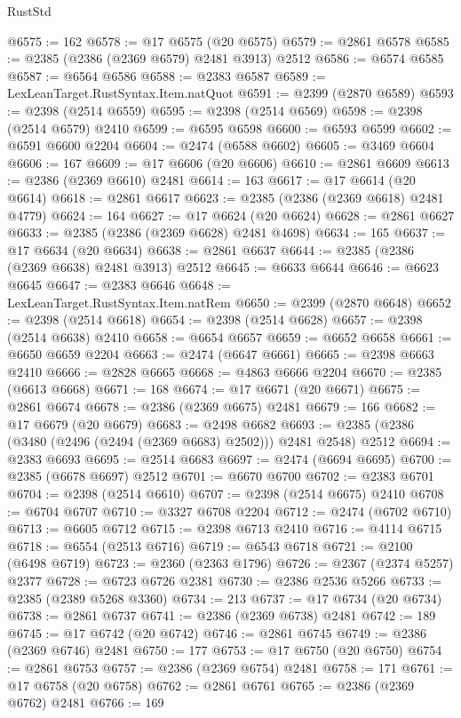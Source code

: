 \begin{lexlean}{RustStd}
\begin{coremodule}
{\begin{coremodule}
{{{{{{{{{{{{{{{{{{{{{{{{{{{{{{{{{{{{{{{{{{{{{{{{{{@6575 := 162
@6578 := @17 @6575 (@20 @6575)
@6579 := @2861 @6578
@6585 := @2385 (@2386 (@2369 @6579) @2481 @3913) @2512
@6586 := @6574 @6585
@6587 := @6564 @6586
@6588 := @2383 @6587
@6589 := LexLeanTarget.RustSyntax.Item.natQuot
@6591 := @2399 (@2870 @6589)
@6593 := @2398 (@2514 @6559)
@6595 := @2398 (@2514 @6569)
@6598 := @2398 (@2514 @6579) @2410
@6599 := @6595 @6598
@6600 := @6593 @6599
@6602 := @6591 @6600 @2204
@6604 := @2474 (@6588 @6602)
@6605 := @3469 @6604
@6606 := 167
@6609 := @17 @6606 (@20 @6606)
@6610 := @2861 @6609
@6613 := @2386 (@2369 @6610) @2481
@6614 := 163
@6617 := @17 @6614 (@20 @6614)
@6618 := @2861 @6617
@6623 := @2385 (@2386 (@2369 @6618) @2481 @4779)
@6624 := 164
@6627 := @17 @6624 (@20 @6624)
@6628 := @2861 @6627
@6633 := @2385 (@2386 (@2369 @6628) @2481 @4698)
@6634 := 165
@6637 := @17 @6634 (@20 @6634)
@6638 := @2861 @6637
@6644 := @2385 (@2386 (@2369 @6638) @2481 @3913) @2512
@6645 := @6633 @6644
@6646 := @6623 @6645
@6647 := @2383 @6646
@6648 := LexLeanTarget.RustSyntax.Item.natRem
@6650 := @2399 (@2870 @6648)
@6652 := @2398 (@2514 @6618)
@6654 := @2398 (@2514 @6628)
@6657 := @2398 (@2514 @6638) @2410
@6658 := @6654 @6657
@6659 := @6652 @6658
@6661 := @6650 @6659 @2204
@6663 := @2474 (@6647 @6661)
@6665 := @2398 @6663 @2410
@6666 := @2828 @6665
@6668 := @4863 @6666 @2204
@6670 := @2385 (@6613 @6668)
@6671 := 168
@6674 := @17 @6671 (@20 @6671)
@6675 := @2861 @6674
@6678 := @2386 (@2369 @6675) @2481
@6679 := 166
@6682 := @17 @6679 (@20 @6679)
@6683 := @2498 @6682
@6693 := @2385 (@2386 (@3480 (@2496 (@2494 (@2369 @6683) @2502))) @2481 @2548) @2512
@6694 := @2383 @6693
@6695 := @2514 @6683
@6697 := @2474 (@6694 @6695)
@6700 := @2385 (@6678 @6697) @2512
@6701 := @6670 @6700
@6702 := @2383 @6701
@6704 := @2398 (@2514 @6610)
@6707 := @2398 (@2514 @6675) @2410
@6708 := @6704 @6707
@6710 := @3327 @6708 @2204
@6712 := @2474 (@6702 @6710)
@6713 := @6605 @6712
@6715 := @2398 @6713 @2410
@6716 := @4114 @6715
@6718 := @6554 (@2513 @6716)
@6719 := @6543 @6718
@6721 := @2100 (@6498 @6719)
@6723 := @2360 (@2363 @1796)
@6726 := @2367 (@2374 @5257) @2377
@6728 := @6723 @6726 @2381
@6730 := @2386 @2536 @5266
@6733 := @2385 (@2389 @5268 @3360)
@6734 := 213
@6737 := @17 @6734 (@20 @6734)
@6738 := @2861 @6737
@6741 := @2386 (@2369 @6738) @2481
@6742 := 189
@6745 := @17 @6742 (@20 @6742)
@6746 := @2861 @6745
@6749 := @2386 (@2369 @6746) @2481
@6750 := 177
@6753 := @17 @6750 (@20 @6750)
@6754 := @2861 @6753
@6757 := @2386 (@2369 @6754) @2481
@6758 := 171
@6761 := @17 @6758 (@20 @6758)
@6762 := @2861 @6761
@6765 := @2386 (@2369 @6762) @2481
@6766 := 169
}}}}}}}}}}}}}}}}}}}}}}}}}}}}}}}}}}}}}}}}}}}}}}}}}}
\end{coremodule}}
\end{coremodule}
\end{lexlean}
